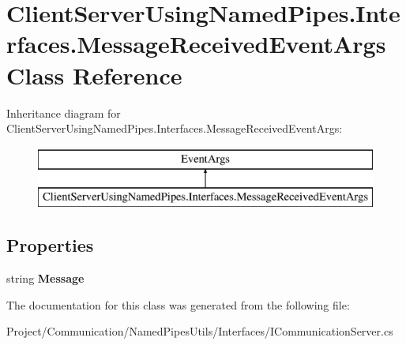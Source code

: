 \hypertarget{class_client_server_using_named_pipes_1_1_interfaces_1_1_message_received_event_args}{}\section{Client\+Server\+Using\+Named\+Pipes.\+Interfaces.\+Message\+Received\+Event\+Args Class Reference}
\label{class_client_server_using_named_pipes_1_1_interfaces_1_1_message_received_event_args}
Inheritance diagram for Client\+Server\+Using\+Named\+Pipes.\+Interfaces.\+Message\+Received\+Event\+Args\+:\begin{figure}[H]
\begin{center}
\leavevmode
\includegraphics[height=2.000000cm]{class_client_server_using_named_pipes_1_1_interfaces_1_1_message_received_event_args}
\end{center}
\end{figure}
\subsection*{Properties}
\begin{DoxyCompactItemize}
\item 
\mbox{\label{class_client_server_using_named_pipes_1_1_interfaces_1_1_message_received_event_args_abf95715ee9354dc8f891b9917c00e5e4}} 
string {\bfseries Message}
\end{DoxyCompactItemize}


The documentation for this class was generated from the following file\+:\begin{DoxyCompactItemize}
\item 
Project/\+Communication/\+Named\+Pipes\+Utils/\+Interfaces/I\+Communication\+Server.\+cs\end{DoxyCompactItemize}

